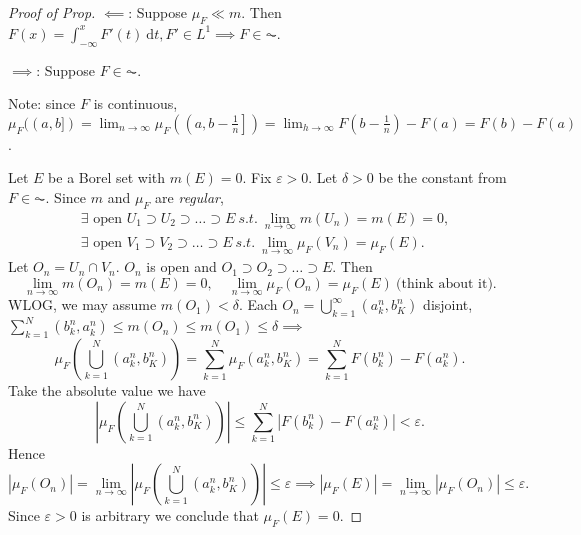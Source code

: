 \documentclass{report}
\newcommand{\st}{\ s.t.\ }
\newcommand{\df}{\ \mathrm{d}}
\theoremstyle{definition}
\theoremstyle{remark}
\begin{document}
\begin{proof}[Proof of Prop]
	$\impliedby$: Suppose $\mu_F \ll m$. Then $F(x) = \int_{-\infty}^x F'(t)\df t, F' \in L^1 \implies F \in \AC$.

	$\implies$: Suppose $F \in \AC$.
	
	Note: since $F$ is continuous, $\mu_F((a, b]) = \lim_{n \to \infty} \mu_F\left(\left(a, b-\frac{1}{n}\right]\right) = \lim_{h \to \infty} F\left(b - \frac{1}{n}\right) - F(a) = F(b) - F(a)$.
	
	Let $E$ be a Borel set with $m(E) = 0$. Fix $\varepsilon > 0$. Let $\delta > 0$ be the constant from $F \in \AC$. Since $m$ and $\mu_F$ are \emph{regular}, \begin{align*}
		& \exists \text{ open } U_1 \supset U_2 \supset \ldots \supset E \st \lim_{n \to \infty} m(U_n) = m(E) = 0, \\
		& \exists \text{ open } V_1 \supset V_2 \supset \ldots \supset E \st \lim_{n \to \infty} \mu_F(V_n) = \mu_F(E).
	\end{align*}
	Let $O_n = U_n \cap V_n$. $O_n$ is open and $O_1 \supset O_2 \supset \ldots \supset E$. Then \[
		\lim_{n \to \infty} m(O_n) = m(E) = 0, \quad \lim_{n \to \infty} \mu_F(O_n) = \mu_F(E)\ \text{(think about it)}.
	\]
	WLOG, we may assume $m(O_1) < \delta$. Each $O_n = \bigcup_{k=1}^\infty (a^n_k, b^n_K)$ disjoint, $\sum_{k=1}^N (b_k^n, a_k^n) \leq m(O_n) \leq m(O_1) \leq \delta \implies$ \[
		\mu_F \left(\bigcup_{k=1}^N (a^n_k, b^n_K)\right) = \sum_{k=1}^N \mu_F(a^n_k, b^n_K) = \sum_{k=1}^N F(b_k^n) - F(a_k^n).
	\]
	Take the absolute value we have \[
		\left|\mu_F \left(\bigcup_{k=1}^N (a^n_k, b^n_K)\right)\right| \leq \sum_{k=1}^N 
		|F(b_k^n) - F(a_k^n)| < \varepsilon.
	\] Hence \[
		|\mu_F(O_n)| = \lim_{n \to \infty} \left|\mu_F \left(\bigcup_{k=1}^N (a^n_k, b^n_K)\right)\right| \leq \varepsilon \implies |\mu_F(E)| = \lim_{n \to \infty} |
		\mu_F(O_n)| \leq \varepsilon.
	\] Since $\varepsilon > 0$ is arbitrary we conclude that $\mu_F(E) = 0$.
\end{proof}
\end{document}
